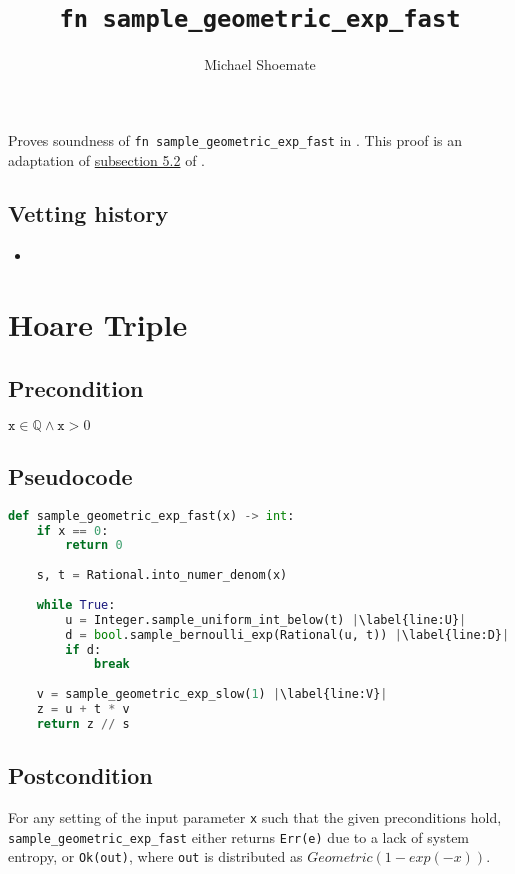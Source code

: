 \documentclass{article}
\title{\texttt{fn sample\_geometric\_exp\_fast}}
\author{Michael Shoemate}
\begin{document}
\maketitle

\contrib
Proves soundness of \texttt{fn sample\_geometric\_exp\_fast} in .
This proof is an adaptation of \href{https://arxiv.org/pdf/2004.00010.pdf#subsection.5.2}{subsection 5.2} of \cite{CKS20}.

\subsection*{Vetting history}
\begin{itemize}
    \item {}
\end{itemize}

\section{Hoare Triple}
\subsection*{Precondition}
$\texttt{x} \in \mathbb{Q} \land \texttt{x} > 0$

\subsection*{Pseudocode}        
\begin{lstlisting}[language=Python, escapechar=|]
def sample_geometric_exp_fast(x) -> int:
    if x == 0:
        return 0
    
    s, t = Rational.into_numer_denom(x)
    
    while True:
        u = Integer.sample_uniform_int_below(t) |\label{line:U}|
        d = bool.sample_bernoulli_exp(Rational(u, t)) |\label{line:D}|
        if d:
            break
        
    v = sample_geometric_exp_slow(1) |\label{line:V}|
    z = u + t * v
    return z // s
\end{lstlisting}

\subsection*{Postcondition}
\label{postcondition}
For any setting of the input parameter \texttt{x} such that the given preconditions hold, \\
\texttt{sample\_geometric\_exp\_fast} either returns \texttt{Err(e)} due to a lack of system entropy,
or \texttt{Ok(out)}, where \texttt{out} is distributed as $Geometric(1 - exp(-x))$.
\end{document}

